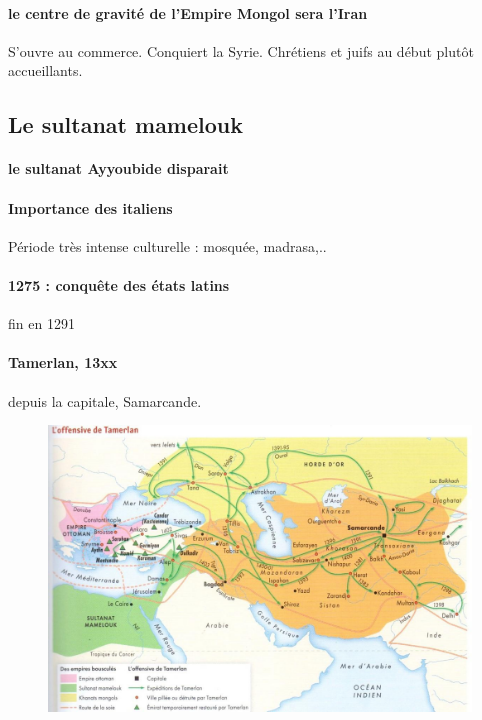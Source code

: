  \paragraph{le centre de gravité de l'Empire Mongol sera l'Iran} S'ouvre au commerce. Conquiert la Syrie. Chrétiens et juifs au début plutôt accueillants.

 
\subsection{Le sultanat mamelouk}


\paragraph{le sultanat Ayyoubide disparait}

\paragraph{Importance des italiens} Période très intense culturelle : mosquée, madrasa,..

\paragraph{1275 : conquête des états latins} fin en 1291


\paragraph{Tamerlan, 13xx} depuis la capitale, Samarcande.
  \begin{figure}[h!]
\centering
{}
\includegraphics[width=\textwidth]{HistoireIslamMediterranee/Images/Tamerlan.jpg}
     
     \label{fig:Mongols}
 \end{figure}

